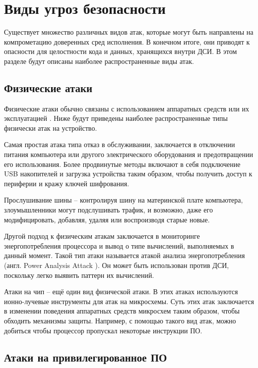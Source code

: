 \section{Виды угроз безопасности}
\label{sec:security}

Существует множество различных видов атак, которые могут быть направлены на компрометацию доверенных сред исполнения. В конечном итоге, они приводят к опасности для целостности кода и данных, хранящихся внутри ДСИ. В этом разделе будут описаны наиболее распространенные виды атак.

\subsection{Физические атаки}

Физические атаки обычно связаны с использованием аппаратных средств или их эксплуатацией \cite{attack-on-chip}. Ниже будут приведены наиболее распространенные типы физически атак на устройство.

Самая простая атака типа отказ в обслуживании, заключается в отключении питания компьютера или другого электрического оборудования и предотвращении его использования. Более продвинутые методы включают в себя подключение USB накопителей и загрузка устройства таким образом, чтобы получить доступ к периферии и кражу ключей шифрования.

Прослушивание шины \cite{attack-on-chip} -- контролируя шину на материнской плате компьютера, злоумышленники могут подслушивать трафик, и возможно, даже его модифицировать, добавляя, удаляя или воспроизводя старые новые.

Другой подход к физическим атакам заключается в мониторинге энергопотребления процессора и вывод о типе вычислений, выполняемых в данный момент. Такой тип атаки называется атакой анализа энергопотребления (англ. Power Analysis Attack \cite{power-analysis-attack}). Он может быть использован против ДСИ, поскольку легко выявить паттерн их вычислений.

Атаки на чип \cite{attack-on-chip} -- ещё один вид физической атаки. В этих атаках используются ионно-лучевые инструменты для атак на микросхемы. Суть этих атак заключается в изменении поведения аппаратных средств микросхем таким образом, чтобы обходить механизмы защиты. Например, с помощью такого вид атак, можно добиться чтобы процессор пропускал некоторые инструкции ПО.

\subsection{Атаки на привилегированное ПО}

